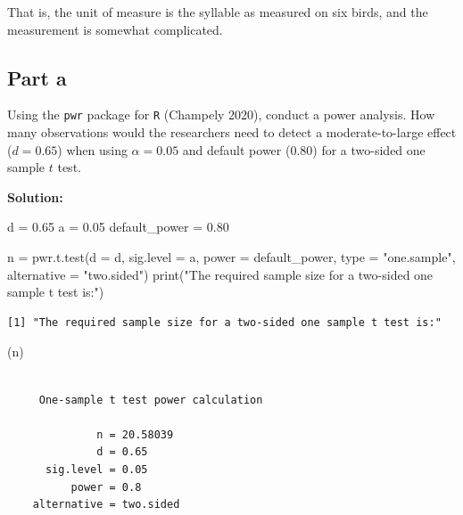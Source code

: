 \documentclass[
]{article}
\newenvironment{Shaded}{\begin{snugshade}}{\end{snugshade}}
\newcommand{\AttributeTok}[1]{\textcolor[rgb]{0.40,0.45,0.13}{#1}}
\newcommand{\FloatTok}[1]{\textcolor[rgb]{0.68,0.00,0.00}{#1}}
\newcommand{\FunctionTok}[1]{\textcolor[rgb]{0.28,0.35,0.67}{#1}}
\newcommand{\NormalTok}[1]{\textcolor[rgb]{0.00,0.23,0.31}{#1}}
\newcommand{\OtherTok}[1]{\textcolor[rgb]{0.00,0.23,0.31}{#1}}
\newcommand{\StringTok}[1]{\textcolor[rgb]{0.13,0.47,0.30}{#1}}
\begin{document}
That is, the unit of measure is the syllable as measured on six birds,
and the measurement is somewhat complicated.

\subsection{Part a}\label{part-a}

Using the \texttt{pwr} package for \texttt{R} (Champely 2020), conduct a
power analysis. How many observations would the researchers need to
detect a moderate-to-large effect (\(d=0.65\)) when using
\(\alpha=0.05\) and default power (0.80) for a two-sided one sample
\(t\) test.

\textbf{Solution:}

\normalsize

\begin{Shaded}
\begin{Highlighting}[numbers=left,,]
\NormalTok{d }\OtherTok{=} \FloatTok{0.65}
\NormalTok{a }\OtherTok{=} \FloatTok{0.05}
\NormalTok{default\_power }\OtherTok{=} \FloatTok{0.80}

\NormalTok{n }\OtherTok{=} \FunctionTok{pwr.t.test}\NormalTok{(}\AttributeTok{d =}\NormalTok{ d,}
              \AttributeTok{sig.level =}\NormalTok{ a,}
              \AttributeTok{power =}\NormalTok{ default\_power,}
              \AttributeTok{type =} \StringTok{"one.sample"}\NormalTok{, }
              \AttributeTok{alternative =} \StringTok{"two.sided"}\NormalTok{)}
\FunctionTok{print}\NormalTok{(}\StringTok{"The required sample size for a two{-}sided one sample t test is:"}\NormalTok{)}
\end{Highlighting}
\end{Shaded}

\begin{verbatim}
[1] "The required sample size for a two-sided one sample t test is:"
\end{verbatim}

\begin{Shaded}
\begin{Highlighting}[numbers=left,,]
\NormalTok{(n)}
\end{Highlighting}
\end{Shaded}

\begin{verbatim}

     One-sample t test power calculation 

              n = 20.58039
              d = 0.65
      sig.level = 0.05
          power = 0.8
    alternative = two.sided
\end{verbatim}
\end{document}
